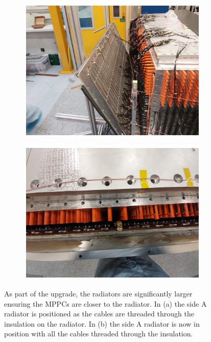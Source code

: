 \begin{figure}[!h]
\centering
\begin{subfigure}{.5\textwidth}
  \centering
  \includegraphics[width=\linewidth]{Chapter3/Figs/Raster/detCon026b_HaningOffRadiator.png}
  \captionsetup{width=.9\linewidth}
  \caption{}
  \label{subFig:detCon026b_HaningOffRadiator}
\end{subfigure}%
\begin{subfigure}{.5\textwidth}
  \centering
  \includegraphics[width=\linewidth]{Chapter3/Figs/Raster/detCon028b_RadiatorTopDown.png}
  \captionsetup{width=.9\linewidth}
  \caption{}
  \label{subFig:detCon028b_RadiatorTopDown}
\end{subfigure}
\caption{As part of the upgrade, the radiators are significantly larger ensuring the MPPCs are closer to the radiator. In (a) the side A radiator is positioned as the cables are threaded through the insulation on the radiator. In (b) the side A radiator is now in position with all the cables threaded through the insulation.}
\label{fig:detCon_HaningOffRadiator_RadiatorTopDown}
\end{figure}

